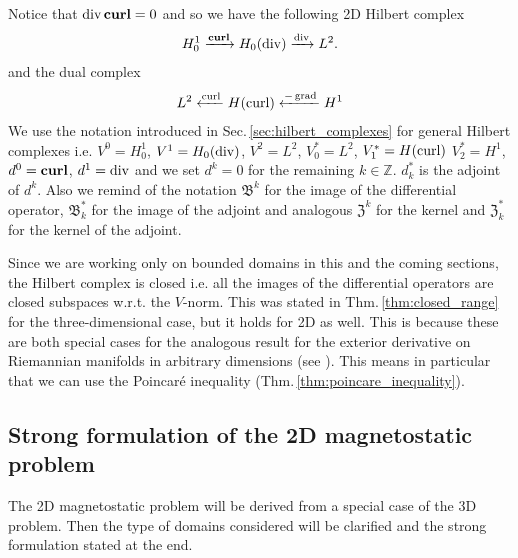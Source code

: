\documentclass[../master_thesis.tex]{subfiles}
\begin{document}
Notice that $\diver \veccurl = 0$ and so 
we have the following 2D Hilbert complex 
\begin{align}
    H^1_0 \xrightarrow{\veccurl} H_0(\diver) \xrightarrow{\diver} L^2. \label{eq:2D_hilbert_complex}
\end{align}
and the dual complex
\begin{align*}
    L^2 \xleftarrow{\operatorname{curl}} H(\operatorname{curl}) \xleftarrow{-\operatorname{grad}} H^1
\end{align*}
We use the notation introduced in Sec.\,\ref{sec:hilbert_complexes} for general Hilbert complexes i.e.
$V^0 = H^1_0$, $V^1= H_0(\operatorname{div})$, $V^2= L^2$, $V^*_0 = L^2$, $V^*_1 = H(\operatorname{curl})$ $V^*_2 = H^1$, 
$d^0 = \veccurl$, $d^1 = \operatorname{div}$ and we set $d^k=0$ for the remaining $k \in \mathbb{Z}$. 
$d^*_k$ is the adjoint of $d^k$.
Also we remind of 
the notation $\mathfrak{B}^k$ for the image of the differential operator, $\mathfrak{B}^*_k$ 
for the image of the adjoint and analogous $\mathfrak{Z}^k$ for the kernel and 
$\mathfrak{Z}_k^*$ for the kernel of the adjoint.

\begin{remark}
    Since we are working only on bounded domains in this and the coming sections, 
    the Hilbert complex is closed i.e. all the images of the differential operators 
    are closed subspaces w.r.t. the $V$-norm. This was stated in 
    Thm.\,\ref{thm:closed_range} for the three-dimensional case, but it holds 
    for 2D as well. This is because these are both special cases for the analogous result 
    for the exterior derivative on Riemannian manifolds 
    in arbitrary dimensions (see \cite[Sec.\,6.2.6]{arnold}). This means
    in particular that we can use the Poincaré inequality (Thm.\,\ref{thm:poincare_inequality}).
\end{remark}

\subsection{Strong formulation of the 2D magnetostatic problem}

The 2D magnetostatic problem will be derived from a special case of the 3D problem.
Then the type of domains considered will be clarified and the strong formulation 
stated at the end.
\end{document}
